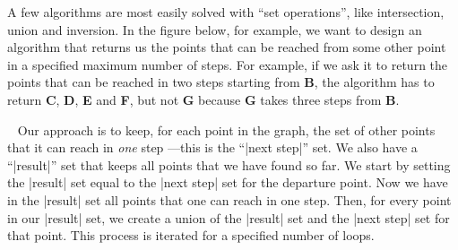 %

\dingbatseparator

  
A few algorithms are most easily solved with ``set operations'', like intersection,
union and inversion. In the figure below, for example, we want to design an
algorithm that returns us the points that can be reached from some other point
in a specified maximum number of steps. For example, if we ask it to return the
points that can be reached in two steps starting from {\bf B}, the algorithm has
to return {\bf C}, {\bf D}, {\bf E} and {\bf F}, but not {\bf G} because {\bf G}
takes three steps from {\bf B}.

~\relax
Our approach is to keep, for each point in the graph, the set of other points
that it can reach in {\it one\/} step ---this is the ``|next step|'' set. We
also have a ``|result|'' set that keeps all points that we have found so far. We
start by setting the |result| set equal to the |next step| set for the departure
point. Now we have in the |result| set all points that one can reach in one
step. Then, for every point in our |result| set, we create a union of the
|result| set and the |next step| set for that point. This process is iterated
for a specified number of loops.

